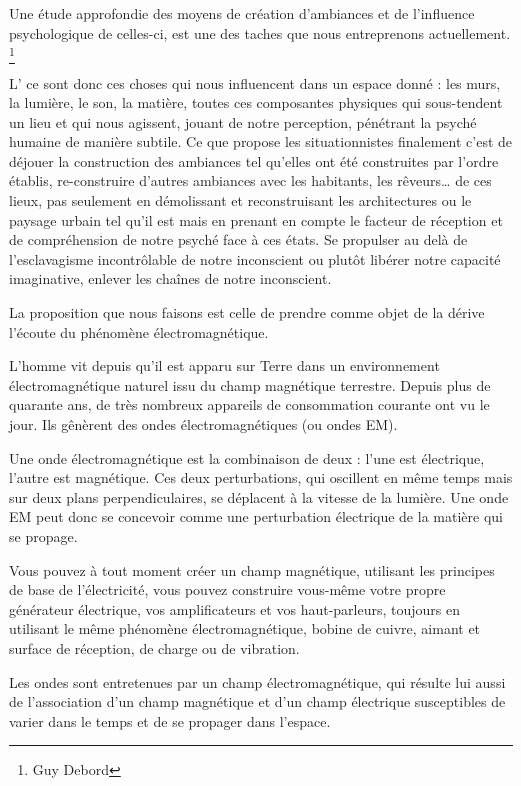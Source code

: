 {{Une \'etude approfondie des moyens de cr\'eation d'ambiances et de l'influence psychologique de celles{}-ci, est une des taches que nous entreprenons actuellement. \footnote{Guy Debord}}

L' ce sont donc ces choses qui nous influencent dans un
espace donn\'e : les murs, la lumi\`ere, le son, la mati\`ere, toutes
ces composantes physiques qui sous{}-tendent un lieu et qui nous
agissent, jouant de notre perception, p\'en\'etrant la psych\'e humaine
de mani\`ere subtile. Ce que propose les situationnistes finalement
c'est de d\'ejouer la construction des ambiances tel
qu'elles ont \'et\'e construites par
l'ordre \'etablis, re{}-construire
d'autres ambiances avec les habitants, les
r\^eveurs{\dots} de ces lieux, pas seulement en d\'emolissant et
reconstruisant les architectures ou le paysage urbain tel qu'il est
mais en prenant en compte le facteur de r\'eception et de
compr\'ehension de notre psych\'e face \`a ces \'etats. Se propulser au
del\`a de l'esclavagisme incontr\^olable de notre inconscient ou
plut\^ot lib\'erer notre capacit\'e imaginative, enlever les cha\^ines
de notre inconscient. 

La proposition que nous faisons est celle de prendre comme objet de la
d\'erive l'\'ecoute du ph\'enom\`ene
\'electromagn\'etique. 

L'homme vit depuis qu'il est apparu
sur Terre dans un environnement \'electromagn\'etique naturel issu du
champ magn\'etique terrestre. Depuis plus de quarante ans, de tr\`es
nombreux appareils de consommation courante ont vu le jour. Ils
g\^en\`erent des ondes \'electromagn\'etiques (ou ondes EM).

Une onde \'electromagn\'etique est la combinaison de deux
: l'une est \'electrique,
l'autre est magn\'etique. Ces deux perturbations, qui
oscillent en m\^eme temps mais sur deux plans perpendiculaires, se
d\'eplacent \`a la vitesse de la lumi\`ere. Une onde EM peut donc se
concevoir comme une perturbation \'electrique de la mati\`ere qui se
propage.

Vous pouvez \`a tout moment cr\'eer un champ magn\'etique, utilisant les
principes de base de l'\'electricit\'e, vous pouvez
construire vous{}-m\^eme votre propre g\'en\'erateur \'electrique, vos
amplificateurs et vos haut{}-parleurs, toujours en utilisant le m\^eme
ph\'enom\`ene \'electromagn\'etique, bobine de cuivre, aimant et
surface de r\'eception, de charge ou de vibration.

Les ondes sont entretenues par un champ \'electromagn\'etique, qui
r\'esulte lui aussi de l'association
d'un champ magn\'etique et d'un champ
\'electrique susceptibles de varier dans le temps et de se propager
dans l'espace. 

}

